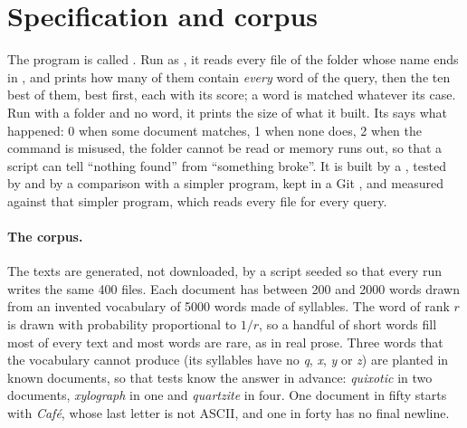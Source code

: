 \section{Specification and corpus}\label{sec:b1:project-text-search-engine:spec}

The program is called . Run as , it reads every file of the folder 
whose name ends in , and prints how many of them contain \emph{every} word of the query, then the ten best of
them, best first, each with its score; a word is matched whatever its case. Run with a folder and no word, it prints the
size of what it built. Its  says what happened: 0 when some document matches, 1 when none does, 2 when the
command is misused, the folder cannot be read or memory runs out, so that a script can tell ``nothing found'' from ``something broke''.
It is built by a , tested by  and by a comparison with a simpler program, kept in a Git ,
and measured against that simpler program, which reads every file for every query.


\paragraph{The corpus.} The texts are generated, not downloaded, by a script seeded so that every run writes the same
400 files. Each document has between 200 and 2000 words drawn from an invented vocabulary of 5000 words made of
syllables. The word of rank $r$ is drawn with probability proportional to $1/r$, so a handful of short words fill
most of every text and most words are rare, as in real prose. Three words that the vocabulary cannot produce (its
syllables have no \emph{q}, \emph{x}, \emph{y} or \emph{z}) are planted in known documents, so that tests know the
answer in advance: \emph{quixotic} in two documents, \emph{xylograph} in one and \emph{quartzite} in four. One
document in fifty starts with \emph{Café}, whose last letter is not ASCII, and one in forty has no final newline.

\label{lst:b1:project-text-search-engine:corpus}

